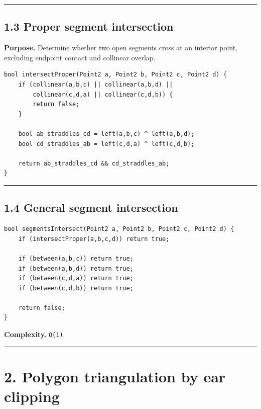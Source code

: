 \documentclass[11pt]{article}
\begin{document}
\begin{center}\rule{0.5\linewidth}{0.5pt}\end{center}

\subsection{1.3 Proper segment
intersection}\label{proper-segment-intersection}

\textbf{Purpose.} Determine whether two open segments cross at an
interior point, excluding endpoint contact and collinear overlap.

\begin{verbatim}
bool intersectProper(Point2 a, Point2 b, Point2 c, Point2 d) {
    if (collinear(a,b,c) || collinear(a,b,d) ||
        collinear(c,d,a) || collinear(c,d,b)) {
        return false;
    }

    bool ab_straddles_cd = left(a,b,c) ^ left(a,b,d);
    bool cd_straddles_ab = left(c,d,a) ^ left(c,d,b);

    return ab_straddles_cd && cd_straddles_ab;
}
\end{verbatim}

\begin{center}\rule{0.5\linewidth}{0.5pt}\end{center}

\subsection{1.4 General segment
intersection}\label{general-segment-intersection}

\begin{verbatim}
bool segmentsIntersect(Point2 a, Point2 b, Point2 c, Point2 d) {
    if (intersectProper(a,b,c,d)) return true;

    if (between(a,b,c)) return true;
    if (between(a,b,d)) return true;
    if (between(c,d,a)) return true;
    if (between(c,d,b)) return true;

    return false;
}
\end{verbatim}

\textbf{Complexity.} \texttt{O(1)}.

\begin{center}\rule{0.5\linewidth}{0.5pt}\end{center}

\section{2. Polygon triangulation by ear
clipping}\label{polygon-triangulation-by-ear-clipping}
\end{document}
